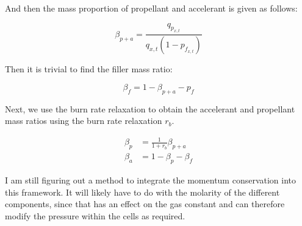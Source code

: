 And then the mass proportion of propellant and accelerant is given as follows:

\begin{equation}
    \beta_{p+a} = \frac{q_{p_{x,t}}}{q_{x,t}(1-p_{f_{x,t}})}
\end{equation}

Then it is trivial to find the filler mass ratio:

\begin{equation}
    \beta_f = 1-\beta_{p+a}-p_f
\end{equation}

Next, we use the burn rate relaxation to obtain the accelerant and propellant
mass ratios using the burn rate relaxation $r_b$.

\begin{align}
    \beta_p &= \frac{1}{1+r_b} \beta_{p+a} \\
    \beta_a &= 1-\beta_p-\beta_f
\end{align}

I am still figuring out a method to integrate the momentum conservation
into this framework. It will likely have to do with the molarity of the different
components, since that has an effect on the gas constant and can
therefore modify the pressure within the cells as required.




